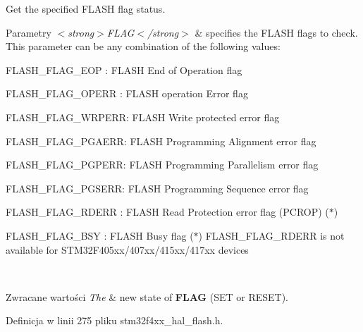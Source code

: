 Get the specified F\+L\+A\+SH flag status. 


\begin{DoxyParams}{Parametry}
{\em $<$strong$>$\+F\+L\+A\+G$<$/strong$>$} & specifies the F\+L\+A\+SH flags to check. This parameter can be any combination of the following values\+: \begin{DoxyItemize}
\item F\+L\+A\+S\+H\+\_\+\+F\+L\+A\+G\+\_\+\+E\+OP \+: F\+L\+A\+SH End of Operation flag \item F\+L\+A\+S\+H\+\_\+\+F\+L\+A\+G\+\_\+\+O\+P\+E\+RR \+: F\+L\+A\+SH operation Error flag \item F\+L\+A\+S\+H\+\_\+\+F\+L\+A\+G\+\_\+\+W\+R\+P\+E\+RR\+: F\+L\+A\+SH Write protected error flag \item F\+L\+A\+S\+H\+\_\+\+F\+L\+A\+G\+\_\+\+P\+G\+A\+E\+RR\+: F\+L\+A\+SH Programming Alignment error flag \item F\+L\+A\+S\+H\+\_\+\+F\+L\+A\+G\+\_\+\+P\+G\+P\+E\+RR\+: F\+L\+A\+SH Programming Parallelism error flag \item F\+L\+A\+S\+H\+\_\+\+F\+L\+A\+G\+\_\+\+P\+G\+S\+E\+RR\+: F\+L\+A\+SH Programming Sequence error flag \item F\+L\+A\+S\+H\+\_\+\+F\+L\+A\+G\+\_\+\+R\+D\+E\+RR \+: F\+L\+A\+SH Read Protection error flag (P\+C\+R\+OP) ($\ast$) \item F\+L\+A\+S\+H\+\_\+\+F\+L\+A\+G\+\_\+\+B\+SY \+: F\+L\+A\+SH Busy flag ($\ast$) F\+L\+A\+S\+H\+\_\+\+F\+L\+A\+G\+\_\+\+R\+D\+E\+RR is not available for S\+T\+M32\+F405xx/407xx/415xx/417xx devices \end{DoxyItemize}
\\
\hline
\end{DoxyParams}

\begin{DoxyRetVals}{Zwracane wartości}
{\em The} & new state of {\bfseries F\+L\+AG} (S\+ET or R\+E\+S\+ET). \\
\hline
\end{DoxyRetVals}


Definicja w linii 275 pliku stm32f4xx\+\_\+hal\+\_\+flash.\+h.

\mbox{\label{group___f_l_a_s_h___exported___macros_gaa537e44d74ce35ff5bfef80edf03f895}} 
